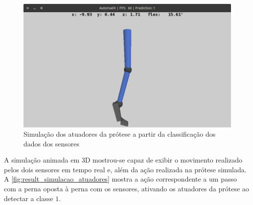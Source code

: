 \begin{figure}[ht]
	\caption{\label{fig:result_simulacao_atuadores}Simulação dos atuadores da prótese a partir da classificação dos dados dos sensores}
	\begin{center}
	    \includegraphics[width=\textwidth]{resources/result_simulacao_atuadores}
	\end{center}
\end{figure}

A simulação animada em 3D mostrou-se capaz de exibir o movimento realizado pelos dois sensores em tempo real e, além da ação realizada na prótese simulada. A \autoref{fig:result_simulacao_atuadores} mostra a ação correspondente a um passo com a perna oposta à perna com os sensores, ativando os atuadores da prótese ao detectar a classe \(1\).


